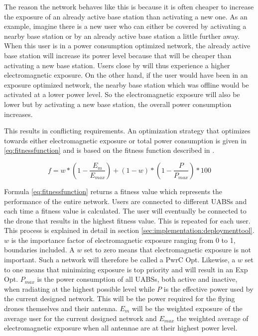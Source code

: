 The reason the network behaves like this is because it is often cheaper to increase the exposure of an already active base station 
than activating a new one. 
As an example, imagine there is a new user who can either be covered by activating a nearby base station or 
by an already active base station a little further away. When this user is in a power consumption optimized network, 
the already active base station will increase its power level because that will be cheaper than activating a new base station. 
Users close by will thus experience a higher electromagnetic exposure. On the other hand, if the user would have been in an exposure 
optimized network, the nearby base station which was offline would be activated at a lower power level. So the electromagnetic 
exposure will also be lower but by activating a new base station, the overall power consumption increases.

This results in conflicting requirements. An optimization strategy that 
optimizes towards either electromagnetic exposure or total power consumption is given in \ref{eq:fitnessfunction} and is
based on the fitness function described in \cite{J1}.

\begin{equation} 
f = w * \left(1 - \frac{E_m}{E_{max}}\right) + (1 - w)*\left(1 - \frac{P}{P_{max}}\right) * 100
\label{eq:fitnessfunction}
\end{equation}

Formula \ref{eq:fitnessfunction} returns a fitness value which represents the performance of the entire network. Users are connected to different \gls{UABS}s and each time a fitness value is 
calculated. The user will eventually be connected to the drone that results in the highest fitness value. 
This is repeated for each user. This process is explained in detail in section \ref{sec:implementation:deploymenttool}.
$w$ is the importance factor of electromagnetic exposure ranging from 0 to 1, boundaries included. A $w$ set to zero means that electromagnetic 
exposure is not important. Such a network will therefore be called a \gls{PwrC Opt}. 
Likewise, a $w$ set to one means that minimizing exposure is top priority and will result in an \gls{Exp Opt}. $P_{max}$ is the power consumption of all \gls{UABS}s, both active and inactive, when radiating at the highest possible level 
while $P$ is the effective power used by the current designed network. 
This will be the power required for the flying drones themselves and their antenna.
$E_m$ will be the weighted exposure of the average user for the current designed network and $E_{max}$ the weighted average of electromagnetic exposure when all antennae are at their highest power level.

